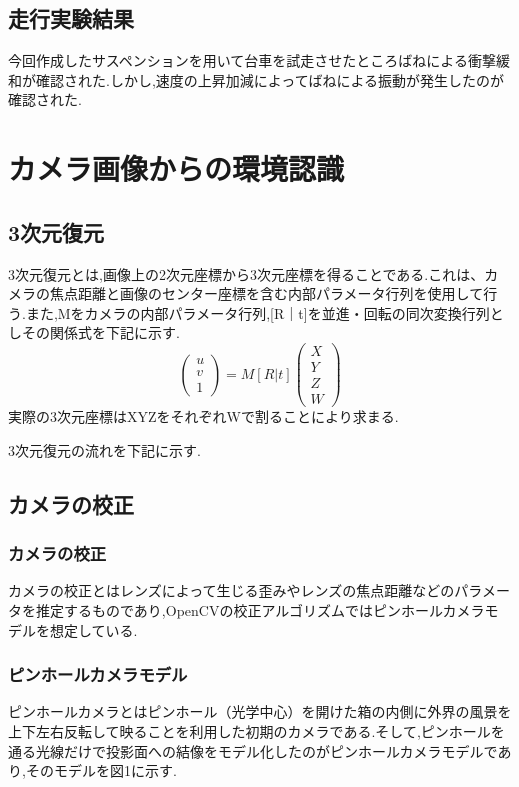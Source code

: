\documentclass[a4paper]{jarticle}
\begin{document}
\subsection{走行実験結果}
今回作成したサスペンションを用いて台車を試走させたところばねによる衝撃緩和が確認された.しかし,速度の上昇加減によってばねによる振動が発生したのが確認された.


\section{カメラ画像からの環境認識}
\subsection{3次元復元}
3次元復元とは,画像上の2次元座標から3次元座標を得ることである.これは、カメラの焦点距離と画像のセンター座標を含む内部パラメータ行列を使用して行う.また,Mをカメラの内部パラメータ行列,[R｜t]を並進・回転の同次変換行列としその関係式を下記に示す.
\begin{equation}
\left(
    \begin{array}{c}
      u \\
      v \\
      1 
    \end{array}
  \right)=M[R|t]\left(
    \begin{array}{c}
      X \\
      Y \\
      Z \\
      W
    \end{array}
  \right)
\end{equation}
実際の3次元座標はXYZをそれぞれWで割ることにより求まる.

3次元復元の流れを下記に示す.

\subsection{カメラの校正}
\subsubsection{カメラの校正}
カメラの校正とはレンズによって生じる歪みやレンズの焦点距離などのパラメータを推定するものであり,OpenCVの校正アルゴリズムではピンホールカメラモデルを想定している.

\subsubsection{ピンホールカメラモデル}
ピンホールカメラとはピンホール（光学中心）を開けた箱の内側に外界の風景を上下左右反転して映ることを利用した初期のカメラである.そして,ピンホールを通る光線だけで投影面への結像をモデル化したのがピンホールカメラモデルであり,そのモデルを図1に示す.
\end{document}
